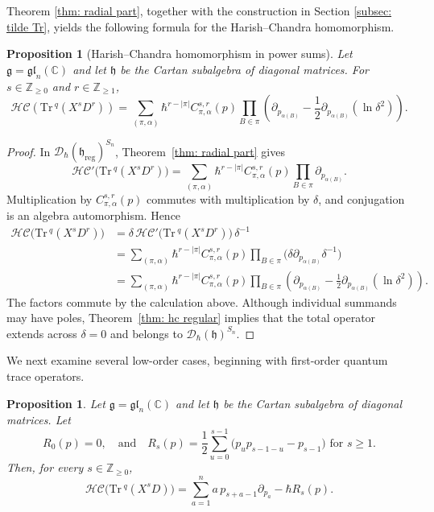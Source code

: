 \documentclass[11pt,reqno]{amsart}
\newtheorem{proposition}[theorem]{Proposition}
\theoremstyle{definition}
\newcommand{\bbC}{\mathbb{C}}
\newcommand{\bbZ}{\mathbb{Z}}
\newcommand{\gl}{\mathfrak{gl}}
\newcommand{\Tr}{\mathrm{Tr} \,}
\newcommand{\fkg}{\mathfrak{g}}
\newcommand{\fkh}{\mathfrak{h}}
\newcommand{\hc}{\mathcal{HC}}
\newcommand{\reg}{\mathrm{reg}}
\begin{document}
Theorem \ref{thm: radial part}, together with the construction in Section \ref{subsec: tilde Tr}, yields the following formula for the Harish--Chandra homomorphism.


\begin{proposition}[Harish--Chandra homomorphism in power sums]
	\label{prop: hc formula power sums}
	Let \(\fkg=\gl_n(\bbC)\) and let \(\fkh\) be the Cartan subalgebra
	of diagonal matrices. For \(s\in\bbZ_{\geq0}\) and
	\(r\in\bbZ_{\geq1}\),
	\[
	\hc(\Tr^q(X^sD^r))
	=
	\sum_{(\pi,\alpha)}\hbar^{r-|\pi|}
	C_{\pi,\alpha}^{s,r}(p)
	\prod_{B\in\pi}
	\left(
	\partial_{p_{\alpha(B)}}
	-
	\frac12\partial_{p_{\alpha(B)}}(\ln\delta^2)
	\right).
	\]
\end{proposition}
\begin{proof}
In \(\mathcal D_\hbar(\fkh_{\reg})^{S_n}\),
Theorem~\ref{thm: radial part} gives
\[
\hc'\bigl(\Tr^q(X^sD^r)\bigr)
=
\sum_{(\pi,\alpha)}\hbar^{r-|\pi|}
C_{\pi,\alpha}^{s,r}(p)
\prod_{B\in\pi}\partial_{p_{\alpha(B)}}.
\]
Multiplication by \(C_{\pi,\alpha}^{s,r}(p)\) commutes with
multiplication by \(\delta\), and conjugation is an algebra
automorphism.  Hence
\[
\begin{aligned}
\hc\bigl(\Tr^q(X^sD^r)\bigr)
&=\delta\,\hc'\bigl(\Tr^q(X^sD^r)\bigr)\,\delta^{-1}\\
&=
\sum_{(\pi,\alpha)}\hbar^{r-|\pi|}
C_{\pi,\alpha}^{s,r}(p)
\prod_{B\in\pi}
\bigl(\delta\partial_{p_{\alpha(B)}}\delta^{-1}\bigr)\\
&=
\sum_{(\pi,\alpha)}\hbar^{r-|\pi|}
C_{\pi,\alpha}^{s,r}(p)
\prod_{B\in\pi}\left(
	\partial_{p_{\alpha(B)}}
	-
	\frac12\partial_{p_{\alpha(B)}}(\ln\delta^2)
	\right).
\end{aligned}
\]
The factors commute by the calculation above.  Although individual
summands may have poles, Theorem~\ref{thm: hc regular} implies that the
total operator extends across \(\delta=0\) and belongs to
\(\mathcal D_\hbar(\fkh)^{S_n}\).
\end{proof}





We next examine several low-order cases, beginning with first-order quantum trace operators.

\begin{proposition}
	Let \(\fkg = \gl_n (\bbC)\) and let \(\fkh\) be the Cartan subalgebra of diagonal matrices. 
	Let
	\[
		R_0(p)=0,\quad
		\text{and}\quad
		R_s(p)
		=
		\frac12
		\sum_{u=0}^{s-1}
		\bigl(p_u p_{s-1-u}-p_{s-1}\bigr) \text{ for \(s\geq1\).}
	\]
	{Then, for every \(s\in\bbZ_{\geq0}\),}
	\[
   \hc\bigl(\Tr^q(X^sD)\bigr)
   =
   \sum_{a=1}^n
   a\,p_{s+a-1}\partial_{p_a}
   -
   \hbar R_s(p).
   \]
\end{proposition}
\end{document}
